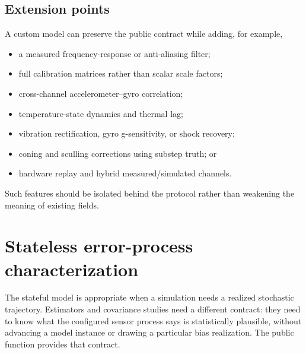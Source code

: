 \documentclass[11pt,oneside,headings=big]{scrreprt}
\begin{document}
    \section{Extension points}
    A custom model can preserve the public contract while adding, for example,
    \begin{itemize}
        \item a measured frequency-response or anti-aliasing filter;
        \item full calibration matrices rather than scalar scale factors;
        \item cross-channel accelerometer--gyro correlation;
        \item temperature-state dynamics and thermal lag;
        \item vibration rectification, gyro g-sensitivity, or shock recovery;
        \item coning and sculling corrections using substep truth; or
        \item hardware replay and hybrid measured/simulated channels.
    \end{itemize}
    Such features should be isolated behind the protocol rather than weakening the
    meaning of existing fields.


    \chapter{Stateless error-process characterization}
    \label{chap:characterization}

    The stateful model is appropriate when a simulation needs a realized stochastic
    trajectory. Estimators and covariance studies need a different contract: they
    need to know what the configured sensor process says is statistically plausible,
    without advancing a model instance or drawing a particular bias realization.
    The public function
     provides that contract.
\end{document}
